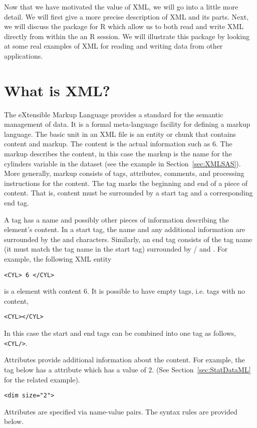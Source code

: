 Now that we have motivated the value of XML, we will go into a little
more detail. We will first give a more precise description of XML and
its parts. Next, we will discuss the  package for R
which allow us to both read and write XML directly from within the an
R session.  We will illustrate this package by looking at some real
examples of XML for reading and writing data from other applications.



\section{What is XML?}
The eXtensible Markup Language provides a standard for the semantic 
management of data.  
It is a formal meta-language facility for defining a markup language.
The basic unit in an XML file is an entity
or chunk that contains content and markup.
The content is the actual information such as 6. 
The markup describes the content, in this case the
markup is the name  for the cylinders
variable in the dataset
(see the example in Section~\ref{sec:XMLSAS}).
More generally, markup consists of tags, attributes, comments,
and processing instructions for the content.
The tag marks the beginning and end of a piece of content. 
That is, content must be surrounded by a start tag 
and a corresponding end tag.

A tag has a name and possibly other pieces of information
describing the element's content.
In a start tag, the name and any additional information are surrounded 
by the \lt and \gt characters. 
Similarly, an end tag consists of the tag name (it must match
the tag name in the start tag) surrounded by \lt/ and \gt. 
For example, the following XML entity
\begin{verbatim}
<CYL> 6 </CYL>
\end{verbatim}
is a  element with content 6.
It is possible to have empty tags, i.e. tags
with no content,
\begin{verbatim}
<CYL></CYL>
\end{verbatim}
In this case the start and end tags can be combined 
into one tag as follows, \verb+<CYL/>+.

Attributes provide additional information about the content. 
For example, the  tag below has a  
attribute which has a value of 2. (See Section~\ref{sec:StatDataML}
for the related example).
\begin{verbatim}
<dim size="2">
\end{verbatim}
Attributes are specified via name-value pairs.
The syntax rules are provided below.


